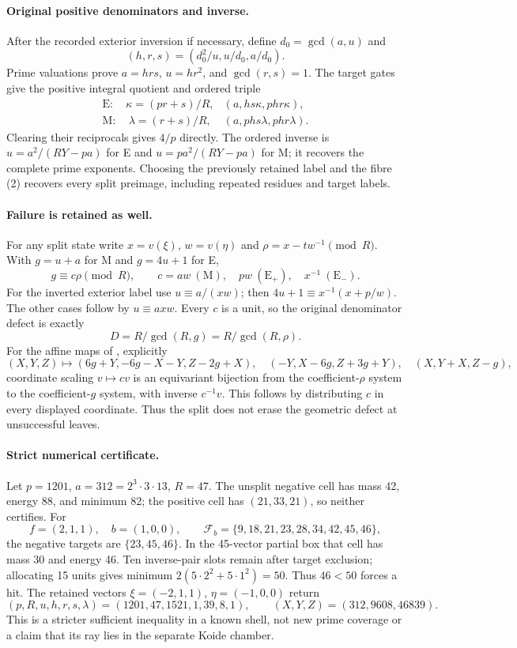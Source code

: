 \documentclass[10pt,a4paper]{article}
\begin{document}
\paragraph{Original positive denominators and inverse.}
After the recorded exterior inversion if necessary, define
$d_0=\gcd(a,u)$ and
\[
 (h,r,s)=(d_0^2/u,u/d_0,a/d_0).
\]
Prime valuations prove $a=hrs$, $u=hr^2$, and $\gcd(r,s)=1$.
The target gates give the positive integral quotient and ordered triple
\[
 \begin{array}{ll}
 \mathrm E:\quad\kappa=(pr+s)/R,&(a,hs\kappa,phr\kappa),\\
 \mathrm M:\quad\lambda=(r+s)/R,&(a,phs\lambda,phr\lambda).
 \end{array}                                                   \tag{6}
\]
Clearing their reciprocals gives $4/p$ directly. The ordered inverse is
$u=a^2/(RY-pa)$ for E and $u=pa^2/(RY-pa)$ for M; it recovers the complete
prime exponents. Choosing the previously retained label and the fibre (2)
recovers every split preimage, including repeated residues and target labels.

\paragraph{Failure is retained as well.}
For any split state write $x=v(\xi)$, $w=v(\eta)$ and
$\rho=x-tw^{-1}\pmod R$. With $g=u+a$ for M and $g=4u+1$ for E,
\[
 g\equiv c\rho\pmod R,\qquad
 c=aw\ (\mathrm M),\quad pw\ (\mathrm E_+),\quad x^{-1}\ (\mathrm E_-).
 \tag{7}
\]
For the inverted exterior label use $u\equiv a/(xw)$; then
$4u+1\equiv x^{-1}(x+p/w)$. The other cases follow by $u\equiv axw$.
Every $c$ is a unit, so the original denominator defect is exactly
\[
 \boxed{D=R/\gcd(R,g)=R/\gcd(R,\rho).}                         \tag{8}
\]
For the affine maps of \cite{Hex}, explicitly
\[
 (X,Y,Z)\mapsto(6g+Y,-6g-X-Y,Z-2g+X),\quad
 (-Y,X-6g,Z+3g+Y),\quad(X,Y+X,Z-g),
\]
coordinate scaling $v\mapsto cv$ is an equivariant bijection from the
coefficient-$\rho$ system to the coefficient-$g$ system, with inverse
$c^{-1}v$. This follows by distributing $c$ in every displayed coordinate.
Thus the split does not erase the geometric defect at unsuccessful leaves.

\paragraph{Strict numerical certificate.}
Let $p=1201$, $a=312=2^3\cdot3\cdot13$, $R=47$. The unsplit negative
cell has mass 42, energy 88, and minimum 82; the positive cell has
$(21,33,21)$, so neither certifies. For
\[
 f=(2,1,1),\quad b=(1,0,0),\qquad
 \mathcal F_b=\{9,18,21,23,28,34,42,45,46\},
\]
the negative targets are $\{23,45,46\}$. In the 45-vector partial box
that cell has mass 30 and energy 46. Ten inverse-pair slots remain after
target exclusion; allocating 15 units gives minimum
$2(5\cdot2^2+5\cdot1^2)=50$. Thus $46<50$ forces a hit. The retained
vectors $\xi=(-2,1,1)$, $\eta=(-1,0,0)$ return
\[
 (p,R,u,h,r,s,\lambda)=(1201,47,1521,1,39,8,1),\qquad
 (X,Y,Z)=(312,9608,46839).
\]
This is a stricter sufficient inequality in a known shell, not new prime
coverage or a claim that its ray lies in the separate Koide chamber.
\end{document}

